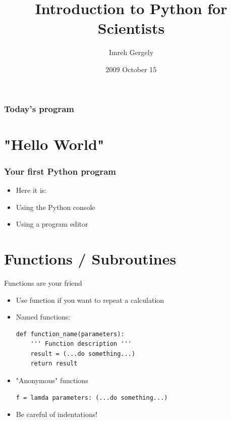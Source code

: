 \documentclass{beamer}
\title[Introduction to Python]{Introduction to Python for Scientists}
\author{Imreh Gergely}
\institute{IAMS}
\date{2009 October 15}
\begin{document}
\begin{frame}
\titlepage
\end{frame}

\begin{frame}
\frametitle{Today's program}
\tableofcontents
\end{frame}

\section{"Hello World"}
\begin{frame}[fragile]
  \frametitle{Your first Python program}
  \begin{itemize}[<+->]
    \item Here it is:

  	\item Using the Python console
  	\item Using a program editor
  \end{itemize}
\end{frame}

\section{Functions / Subroutines}
\begin{frame}[fragile]
  \begin{block}{Functions are your friend}
	 \begin{itemize}[<+->]
		 \item Use function if you want to repeat a calculation
		 \item Named functions:
\begin{lstlisting}
def function_name(parameters):
    ''' Function description '''
    result = (...do something...)
    return result
\end{lstlisting}
		 \item "Anonymous" functions
\begin{lstlisting}
f = lamda parameters: (...do something...)
\end{lstlisting}
		 \item Be careful of indentations!
	 \end{itemize}
  \end{block}
\end{frame}
\end{document}
